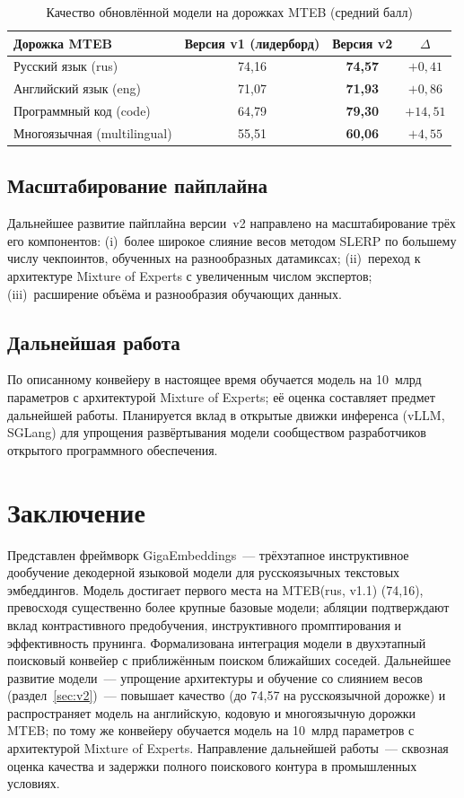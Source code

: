 \documentclass[12pt,a4paper]{article}
\begin{document}
\begin{table}[ht]
  \centering
  \caption{Качество обновлённой модели на дорожках MTEB (средний балл)}\label{tab:v2}
  \begin{tabular}{lccc}
    \toprule
    Дорожка MTEB & Версия v1 (лидерборд) & Версия v2 & $\Delta$ \\
    \midrule
    Русский язык (rus)          & 74,16 & \textbf{74,57} & $+0{,}41$ \\
    Английский язык (eng)       & 71,07 & \textbf{71,93} & $+0{,}86$ \\
    Программный код (code)      & 64,79 & \textbf{79,30} & $+14{,}51$ \\
    Многоязычная (multilingual) & 55,51 & \textbf{60,06} & $+4{,}55$ \\
    \bottomrule
  \end{tabular}
\end{table}

\subsection{Масштабирование пайплайна}
Дальнейшее развитие пайплайна версии~v2 направлено на масштабирование трёх его
компонентов: (i)~более широкое слияние весов методом SLERP по большему числу
чекпоинтов, обученных на разнообразных датамиксах; (ii)~переход к архитектуре
Mixture of Experts с увеличенным числом экспертов; (iii)~расширение объёма и
разнообразия обучающих данных.

\subsection{Дальнейшая работа}
По описанному конвейеру в настоящее время обучается модель на 10~млрд параметров
с архитектурой Mixture of Experts; её оценка составляет предмет дальнейшей
работы. Планируется вклад в открытые движки инференса (vLLM, SGLang) для
упрощения развёртывания модели сообществом разработчиков открытого программного
обеспечения.

\section{Заключение}
Представлен фреймворк GigaEmbeddings~--- трёхэтапное инструктивное дообучение
декодерной языковой модели для русскоязычных текстовых эмбеддингов. Модель
достигает первого места на MTEB(rus, v1.1) (74,16), превосходя существенно более
крупные базовые модели; абляции подтверждают вклад контрастивного предобучения,
инструктивного промптирования и эффективность прунинга. Формализована интеграция
модели в двухэтапный поисковый конвейер с приближённым поиском ближайших соседей.
Дальнейшее развитие модели~--- упрощение архитектуры и обучение со слиянием весов
(раздел~\ref{sec:v2})~--- повышает качество (до 74,57 на русскоязычной дорожке) и
распространяет модель на английскую, кодовую и многоязычную дорожки MTEB; по тому
же конвейеру обучается модель на 10~млрд параметров с архитектурой Mixture of
Experts. Направление дальнейшей
работы~--- сквозная оценка качества и задержки полного поискового контура в
промышленных условиях.
\end{document}
